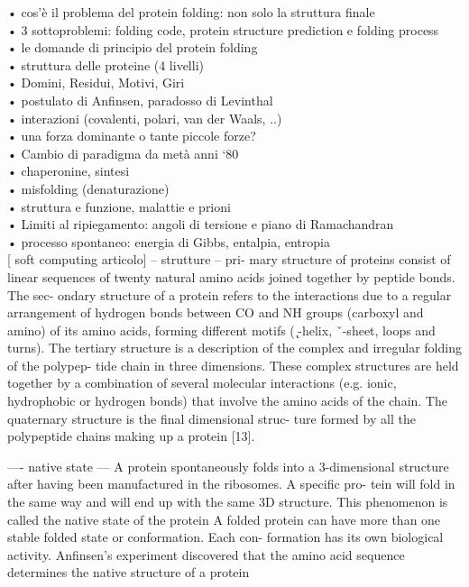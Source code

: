 • cos’è il problema del protein folding: non solo la struttura finale\\
• 3 sottoproblemi: folding code, protein structure prediction e folding process\\
• le domande di principio del protein folding\\
• struttura delle proteine (4 livelli)\\
• Domini, Residui, Motivi, Giri\\
• postulato di Anfinsen, paradosso di Levinthal\\
• interazioni (covalenti, polari, van der Waals, ..)\\
• una forza dominante o tante piccole forze?\\
• Cambio di paradigma da metà anni ‘80\\
• chaperonine, sintesi\\
• misfolding (denaturazione)\\
• struttura e funzione, malattie e prioni\\
• Limiti al ripiegamento: angoli di tersione e piano di Ramachandran\\
• processo spontaneo: energia di Gibbs, entalpia, entropia\\


[ soft computing articolo]
-- strutture --
pri-
mary structure of proteins consist of linear sequences of twenty
natural amino acids joined together by peptide bonds. The sec-
ondary structure of a protein refers to the interactions due to
a regular arrangement of hydrogen bonds between CO and NH
groups (carboxyl and amino) of its amino acids, forming different
motifs ( ̨-helix, ˇ-sheet, loops and turns). The tertiary structure is
a description of the complex and irregular folding of the polypep-
tide chain in three dimensions. These complex structures are held
together by a combination of several molecular interactions (e.g.
ionic, hydrophobic or hydrogen bonds) that involve the amino acids
of the chain. The quaternary structure is the final dimensional struc-
ture formed by all the polypeptide chains making up a protein [13].

---- native state  ---
A protein spontaneously folds into a 3-dimensional structure
after having been manufactured in the ribosomes. A specific pro-
tein will fold in the same way and will end up with the same 3D
structure. This phenomenon is called the native state of the protein 
A folded protein can
have more than one stable folded state or conformation. Each con-
formation has its own biological activity. Anfinsen’s experiment
discovered that the amino acid sequence determines the native
structure of a protein

